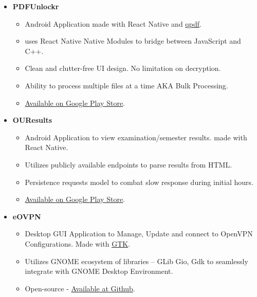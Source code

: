 \documentclass{article}
\begin{document}
\begin{itemize}
    \item \textbf{PDFUnlockr}
    \subitem
    \begin{itemize}
        \vspace{-0.25cm}
        \item Android Application made with React Native and \href{http://qpdf.sourceforge.net/}{qpdf}.
        \item uses React Native Native Modules to bridge between JavaScript and C++.
        \item Clean and clutter-free UI design. No limitation on decryption.
        \item Ability to process multiple files at a time AKA Bulk Processing.
        \item \href{https://play.google.com/store/apps/details?id=com.pdfunlockr}{Available on Google Play Store}.
        \vspace{0.35cm}
    \end{itemize}
    
    \item \textbf{OUResults}
    \subitem
    \begin{itemize}
        \vspace{-0.25cm}
        \item Android Application to view examination/semester results. made with React Native.
        \item Utilizes publicly available endpoints to parse results from HTML.
        \item Persistence requests model to combat slow response during initial hours.
        \item \href{https://play.google.com/store/apps/details?id=com.ouresults}{Available on Google Play Store}.
        \vspace{0.35cm}
    \end{itemize}

    
    \item \textbf{eOVPN}
    \subitem
    \begin{itemize}
        \vspace{-0.25cm}
        \item Desktop GUI Application to Manage, Update and connect to OpenVPN Configurations. Made with \href{https://gtk.org/}{GTK}.
        \item Utilizes GNOME ecosystem of libraries -- GLib Gio, Gdk to seamlessly integrate with GNOME Desktop Environment.
        \item Open-source - \href{https://github.com/jkotra/eOVPN}{Available at Github}.
        \vspace{0.35cm}
    \end{itemize}
    


\end{itemize}
\end{document}

